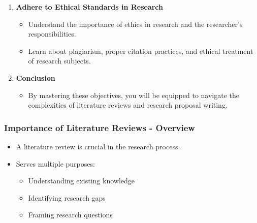 \documentclass[aspectratio=169]{beamer}
\begin{document}
\begin{frame}[fragile]
\begin{enumerate}[resume]
        \item \textbf{Adhere to Ethical Standards in Research}
        \begin{itemize}
            \item Understand the importance of ethics in research and the researcher’s responsibilities.
            \item Learn about plagiarism, proper citation practices, and ethical treatment of research subjects.
        \end{itemize}
        
        \item \textbf{Conclusion}
        \begin{itemize}
            \item By mastering these objectives, you will be equipped to navigate the complexities of literature reviews and research proposal writing.
        \end{itemize}
    \end{enumerate}
\end{frame}

\begin{frame}[fragile]
    \frametitle{Importance of Literature Reviews - Overview}
    \begin{itemize}
        \item A literature review is crucial in the research process.
        \item Serves multiple purposes:
            \begin{itemize}
                \item Understanding existing knowledge
                \item Identifying research gaps
                \item Framing research questions
            \end{itemize}
    \end{itemize}
\end{frame}
\end{document}
